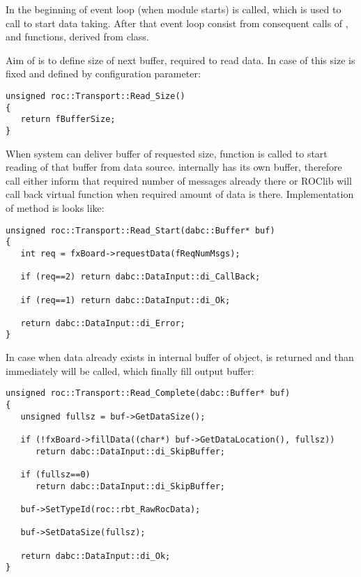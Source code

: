 In the beginning of event loop (when module starts)  is called, which
is used to call  to start data taking. After that
event loop consist from consequent calls of ,  and 
functions, derived from  class. 

Aim of  is to define size of next buffer, required to read data. 
In case of  this size
is fixed and defined by configuration parameter:  

\begin{verbatim}
unsigned roc::Transport::Read_Size()
{
   return fBufferSize;
}
\end{verbatim}
    
When system can deliver buffer of requested size,  function is called to start reading 
of that buffer from data source.  internally has its own buffer, therefore call 
 either inform that required number of messages already there or
ROClib will call back  virtual function when required amount of data is there.
Implementation of method is looks like:

\begin{verbatim}
unsigned roc::Transport::Read_Start(dabc::Buffer* buf)
{
   int req = fxBoard->requestData(fReqNumMsgs);

   if (req==2) return dabc::DataInput::di_CallBack;

   if (req==1) return dabc::DataInput::di_Ok;

   return dabc::DataInput::di_Error;
}
\end{verbatim}

In case when data already exists in internal buffer of  object,  
is returned and than immediately  will be called, which finally fill output buffer:

\begin{verbatim}
unsigned roc::Transport::Read_Complete(dabc::Buffer* buf)
{
   unsigned fullsz = buf->GetDataSize();

   if (!fxBoard->fillData((char*) buf->GetDataLocation(), fullsz)) 
      return dabc::DataInput::di_SkipBuffer;

   if (fullsz==0) 
      return dabc::DataInput::di_SkipBuffer;
   
   buf->SetTypeId(roc::rbt_RawRocData);

   buf->SetDataSize(fullsz);

   return dabc::DataInput::di_Ok;
}
\end{verbatim}

